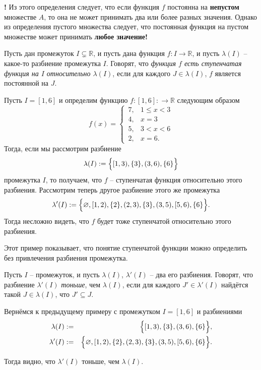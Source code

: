 \begin{mydanger}{\bf !}
 Из этого определения следует, что если функция $f$ постоянна на \textbf{непустом} множестве $A$, то она не может принимать два или более разных значения. Однако из определения пустого множества следует, что постоянная функция на пустом множестве может принимать \textbf{любое значение!}
\end{mydanger}

\begin{definition}
    Пусть дан промежуток $I \subsetneq \mathbb{R}$, и пусть дана функция $f: I \to \mathbb{R}$, и пусть $\lambda(I)$ -- какое-то разбиение промежутка $I$. Говорят, что \textit{функция $f$ есть ступенчатая функция на $I$ относительно $\lambda(I)$}, если для каждого $J \in \lambda(I)$, $f$ является постоянной на $J$. 
\end{definition}

\begin{example}\label{int_[1,6]=10}
    Пусть $I = [1,6]$ и определим функцию $f: [1,6]: \to \mathbb{R}$ следующим образом
    \[
     f(x) = \begin{cases}
         \,7, & 1 \le x < 3 \\
         \,4, & x = 3 \\
         \,5, & 3 < x <6 \\
         \,2, & x = 6.
     \end{cases}
    \]
Тогда, если мы рассмотрим разбиение
\[
 \lambda(I) := \Bigl\{[1,3), \{3\}, (3,6), \{6\} \Bigr\}
\]
промежутка $I$, то получаем, что $f$ -- ступенчатая функция относительно этого разбиения. Рассмотрим теперь другое разбиение этого же промежутка
\[
 \lambda'(I) : = \Bigl\{\varnothing, [1,2), \{2\}, (2,3), \{3\}, (3,5), [5,6),\{6\} \Bigr\}.
\]
Тогда несложно видеть, что $f$ будет тоже ступенчатой относительно этого разбиения. 
\end{example}

Этот пример показывает, что понятие ступенчатой функции можно определить без привлечения разбиения промежутка.

\begin{definition}\label{fiber}
Пусть $I$ -- промежуток, и пусть $\lambda(I)$, $\lambda'(I)$ -- два его разбиения. Говорят, что разбиение $\lambda'(I)$ \textit{тоньше}, чем $\lambda(I)$, если для каждого $J' \in \lambda'(I)$ найдётся такой $J \in \lambda(I)$, что $J' \subseteq J$.
\end{definition}

\begin{example}
 Вернёмся к предыдущему примеру с промежутком $I = [1,6]$ и разбиениями   
 \begin{eqnarray*}
     \lambda(I) &:=& \Bigl\{[1,3), \{3\}, (3,6), \{6\} \Bigr\},\\
     \lambda'(I) &: =& \Bigl\{\varnothing, [1,2), \{2\}, (2,3), \{3\}, (3,5), [5,6),\{6\} \Bigr\}.
 \end{eqnarray*}

Тогда видно, что $\lambda'(I)$ тоньше, чем $\lambda(I)$.
\end{example}


